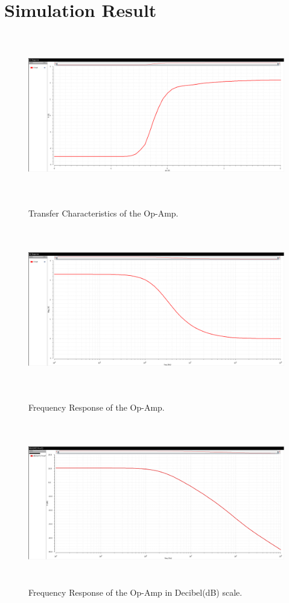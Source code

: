 \documentclass[11pt]{article}
\begin{document}
\section{Simulation Result}
\begin{figure}[!h]
    \centering
    \includegraphics[height=2.8in]{dc.png}
    \caption{Transfer Characteristics of the Op-Amp.}
    \includegraphics[height=2.8in]{ac.png}
    \caption{Frequency Response of the Op-Amp.}
    \includegraphics[height=2.8in]{db.png}
    \caption{Frequency Response of the Op-Amp in Decibel(dB) scale.}
\end{figure}
\end{document}
